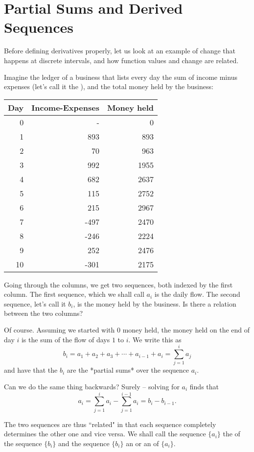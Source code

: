 \section{Partial Sums and Derived Sequences}

Before defining derivatives properly, let us look at an example of change
that happens at discrete intervals, and how function values and change are
related.


Imagine
the ledger of a business that lists every day the sum of income minus expenses
(let's call it the ), and the total money held by the business:

\begin{center}
\begin{tabular}{rrr}
Day&Income-Expenses&Money held\\
\hline
0& - &0\\
1&893&893\\
2&70&963\\
3&992&1955\\
4&682&2637\\
5&115&2752\\
6&215&2967\\
7&-497&2470\\
8&-246&2224\\
9&252&2476\\
10&-301&2175\\
\end{tabular}
\end{center}

Going through the columns, we get two sequences, both indexed by the first
column.  The first sequence, which we shall call $a_i$ is the daily flow.
The second sequence, let's call it $b_i$, is the money held by the business.
Is there a relation between the two columns?

Of course. Assuming we started with $0$ money held, the money held on the end of day
$i$ is the sum of the flow of days $1$ to $i$. We write this as
$$b_i=a_1+a_2+a_3+\cdots+ a_{i-1}+a_i=\sum_{j=1}^i a_j$$
and have that the $b_i$ are the *partial sums* over the sequence $a_i$.

Can we do the same thing backwards? Surely -- solving for $a_i$ finds that
$$a_i=\sum_{j=1}^ia_i-\sum_{j=1}^{i-1}a_i=b_i-b_{i-1}.$$

The two sequences are thus ``related" in that each sequence completely
determines the other one and vice versa. We shall call the sequence $\{a_i\}$
the  of the sequence $\{b_i\}$ and the sequence
$\{b_i\}$
an  or an
 of $\{a_i\}$.

